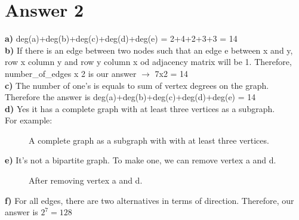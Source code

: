 \documentclass[12pt]{article}
\begin{document}
\section*{Answer 2}
\textbf{a)} deg(a)+deg(b)+deg(c)+deg(d)+deg(e) = 2+4+2+3+3 = 14\\
\textbf{b)} If there is an edge between two nodes such that an edge e between x and y, row x column y and row y column x od adjacency matrix will be 1. Therefore, number\_of\_edges x 2 is our answer $\rightarrow$ 7x2 = 14\\
\textbf{c)} The number of one's is equals to sum of vertex degrees on the graph. Therefore the answer is deg(a)+deg(b)+deg(c)+deg(d)+deg(e) = 14 \\
\newpage
\textbf{d)} Yes it has a complete graph with at least three vertices as a subgraph.\\
For example: \\
\begin{figure}[H]
    \centering
	\caption{A complete graph as a subgraph with with at least three vertices.}	
	\label{fig:d}
\end{figure}
\textbf{e)} It's not a bipartite graph. To make one, we can remove vertex a and d. \\
    \begin{figure}[H]
    	\centering
    	\caption{After removing vertex a and d.}	
    	\label{fig:e}
    \end{figure}
\textbf{f)} For all edges, there are two alternatives in terms of direction. Therefore, our answer is $2^7 = 128$ \\
\end{document}
